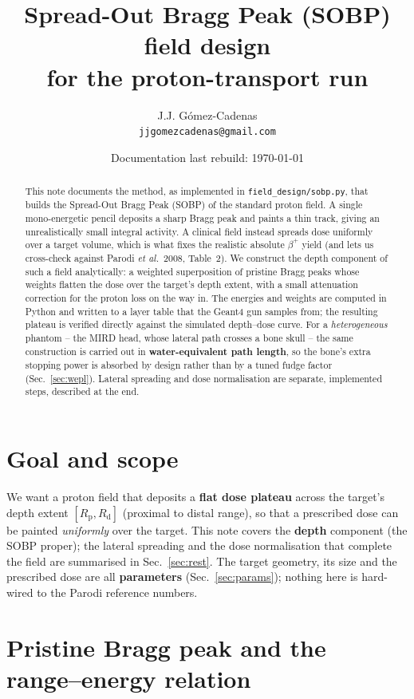 \documentclass[11pt]{article}
\title{Spread-Out Bragg Peak (SOBP) field design\\
for the proton-transport run}
\author{J.J. G\'omez-Cadenas\\\texttt{jjgomezcadenas@gmail.com}}
\date{Documentation last rebuild: \today}
\newcommand{\Rd}{R_{\mathrm d}}
\newcommand{\Rp}{R_{\mathrm p}}
\begin{document}
\maketitle

\begin{abstract}
This note documents the method, as implemented in
\texttt{field\_design/sobp.py}, that builds the Spread-Out Bragg Peak (SOBP) of
the standard proton field. A single mono-energetic pencil deposits a sharp Bragg
peak and paints a thin track, giving an unrealistically small integral activity.
A clinical field instead spreads dose uniformly over a target volume, which is
what fixes the realistic absolute $\beta^{+}$ yield (and lets us cross-check
against Parodi \emph{et al.}\ 2008, Table~2). We construct the depth component of
such a field analytically: a weighted superposition of pristine Bragg peaks whose
weights flatten the dose over the target's depth extent, with a small attenuation
correction for the proton loss on the way in. The energies and weights are
computed in Python and written to a layer table that the Geant4 gun samples from;
the resulting plateau is verified directly against the simulated depth--dose
curve. For a \emph{heterogeneous} phantom -- the MIRD head, whose lateral path
crosses a bone skull -- the same construction is carried out in
\textbf{water-equivalent path length}, so the bone's extra stopping power is
absorbed by design rather than by a tuned fudge factor (Sec.~\ref{sec:wepl}).
Lateral spreading and dose normalisation are separate, implemented steps,
described at the end.
\end{abstract}

\section{Goal and scope}

We want a proton field that deposits a \textbf{flat dose plateau} across the
target's depth extent $[\Rp,\Rd]$ (proximal to distal range), so that a
prescribed dose can be painted \emph{uniformly} over the target. This note
covers the \textbf{depth} component (the SOBP proper); the lateral spreading and
the dose normalisation that complete the field are summarised in
Sec.~\ref{sec:rest}. The target geometry, its size and the prescribed dose are
all \textbf{parameters} (Sec.~\ref{sec:params}); nothing here is hard-wired to
the Parodi reference numbers.

\section{Pristine Bragg peak and the range--energy relation}
\label{sec:pristine}
\end{document}
